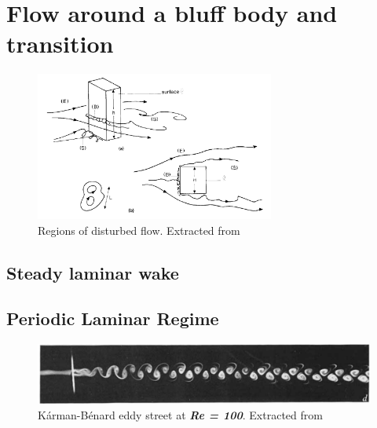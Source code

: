 \documentclass[journal]{new-aiaa}
\begin{document}
\section{Flow around a bluff body and transition}

\begin{figure}[H]
\begin{center}
\includegraphics[width=0.7\textwidth]{Images/federico/Figure01}
\caption{ Regions of disturbed flow. Extracted from \cite{hunt1990} }
\label{fig:RegionsFlow}
\end{center}
\end{figure}

\subsection{Steady laminar wake}

\subsection{Periodic Laminar Regime}


\begin{figure}[H]
\begin{center}
\includegraphics[width=1\textwidth]{Images/federico/Figure02}
\caption{Kárman-Bénard eddy street at \textbf{\textit{Re = 100}}. Extracted from \cite{Zdravkovich1968} }
\label{fig:Laminar}
\end{center}
\end{figure}
\end{document}
